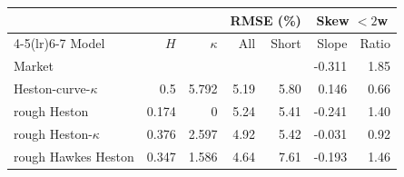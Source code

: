 \begin{tabular}{lrrrrrr}
\toprule
 & & & \multicolumn{2}{c}{RMSE (\%)} & \multicolumn{2}{c}{Skew $<2$w}\\
\cmidrule(lr){4-5}\cmidrule(lr){6-7}
Model & $H$ & $\kappa$ & All & Short & Slope & Ratio\\
\midrule
Market & & & & & -0.311 & 1.85\\
\addlinespace
Heston-curve-$\kappa$ & 0.5 & 5.792 & 5.19 & 5.80 & 0.146 & 0.66\\
rough Heston & 0.174 & 0 & 5.24 & 5.41 & -0.241 & 1.40\\
rough Heston-$\kappa$ & 0.376 & 2.597 & 4.92 & 5.42 & -0.031 & 0.92\\
rough Hawkes Heston & 0.347 & 1.586 & 4.64 & 7.61 & -0.193 & 1.46\\
\bottomrule
\end{tabular}
